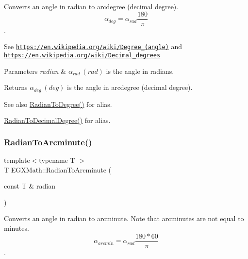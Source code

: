 Converts an angle in radian to arcdegree (decimal degree). \[\alpha_{deg}=\alpha_{rad}\frac{180}{\pi}\]. 

See \href{https://en.wikipedia.org/wiki/Degree_(angle)}{\tt https\+://en.\+wikipedia.\+org/wiki/\+Degree\+\_\+(angle)} and \href{https://en.wikipedia.org/wiki/Decimal_degrees}{\tt https\+://en.\+wikipedia.\+org/wiki/\+Decimal\+\_\+degrees} 
\begin{DoxyParams}{Parameters}
{\em radian} & $\alpha_{rad}\ (rad)$ is the angle in radians. \\
\hline
\end{DoxyParams}
\begin{DoxyReturn}{Returns}
$\alpha_{deg}\ (deg)$ is the angle in arcdegree (decimal degree). 
\end{DoxyReturn}
\begin{DoxySeeAlso}{See also}
\mbox{\hyperlink{group___e_g_x_math-_angle_conversions-_radian_ga25bbce6cdc1c3621f2a158d320e3bc45}{Radian\+To\+Degree()}} for alias. 

\mbox{\hyperlink{group___e_g_x_math-_angle_conversions-_radian_ga6d170f1882c32de53167c04524d05f67}{Radian\+To\+Decimal\+Degree()}} for alias. 
\end{DoxySeeAlso}
\mbox{\label{group___e_g_x_math-_angle_conversions-_radian_ga722e3b8e78540a6b3942b73b64aeb8d2}} 
\subsubsection{\texorpdfstring{Radian\+To\+Arcminute()}{RadianToArcminute()}}
{\footnotesize\ttfamily template$<$typename T $>$ \\
T E\+G\+X\+Math\+::\+Radian\+To\+Arcminute (\begin{DoxyParamCaption}\item[{const T \&}]{radian }\end{DoxyParamCaption})}



Converts an angle in radian to arcminute. Note that arcminutes are not equal to minutes. \[\alpha_{arcmin}=\alpha_{rad}\frac{180 * 60}{\pi}\]. 

